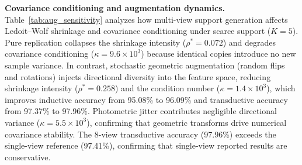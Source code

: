 \textbf{Covariance conditioning and augmentation dynamics.} Table~\ref{tab:aug_sensitivity} analyzes how multi-view support generation affects Ledoit--Wolf shrinkage and covariance conditioning under scarce support ($K=5$). Pure replication collapses the shrinkage intensity ($\rho^* = 0.072$) and degrades covariance conditioning ($\kappa = 9.6\times10^3$) because identical copies introduce no new sample variance. In contrast, stochastic geometric augmentation (random flips and rotations) injects directional diversity into the feature space, reducing shrinkage intensity ($\rho^* = 0.258$) and the condition number ($\kappa = 1.4\times10^3$), which improves inductive accuracy from 95.08\% to 96.09\% and transductive accuracy from 97.37\% to 97.96\%. Photometric jitter contributes negligible directional variance ($\kappa = 5.5\times10^3$), confirming that geometric transforms drive numerical covariance stability. The 8-view transductive accuracy (97.96\%) exceeds the single-view reference (97.41\%), confirming that single-view reported results are conservative.

